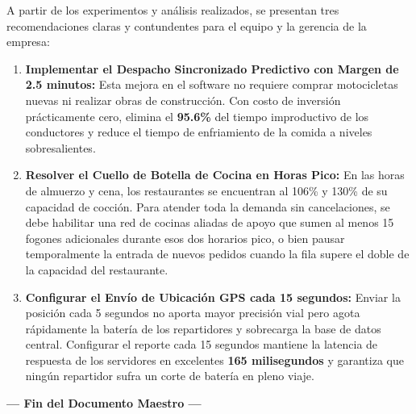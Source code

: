 \documentclass[11pt,a4paper]{article}
\begin{document}
A partir de los experimentos y análisis realizados, se presentan tres recomendaciones claras y contundentes para el equipo y la gerencia de la empresa:

\begin{enumerate}[label=\textbf{\arabic*.}]
    \item \textbf{Implementar el Despacho Sincronizado Predictivo con Margen de 2.5 minutos:} Esta mejora en el software no requiere comprar motocicletas nuevas ni realizar obras de construcción. Con costo de inversión prácticamente cero, elimina el \textbf{95.6\%} del tiempo improductivo de los conductores y reduce el tiempo de enfriamiento de la comida a niveles sobresalientes.
    \item \textbf{Resolver el Cuello de Botella de Cocina en Horas Pico:} En las horas de almuerzo y cena, los restaurantes se encuentran al 106\% y 130\% de su capacidad de cocción. Para atender toda la demanda sin cancelaciones, se debe habilitar una red de cocinas aliadas de apoyo que sumen al menos 15 fogones adicionales durante esos dos horarios pico, o bien pausar temporalmente la entrada de nuevos pedidos cuando la fila supere el doble de la capacidad del restaurante.
    \item \textbf{Configurar el Envío de Ubicación GPS cada 15 segundos:} Enviar la posición cada 5 segundos no aporta mayor precisión vial pero agota rápidamente la batería de los repartidores y sobrecarga la base de datos central. Configurar el reporte cada 15 segundos mantiene la latencia de respuesta de los servidores en excelentes \textbf{165 milisegundos} y garantiza que ningún repartidor sufra un corte de batería en pleno viaje.
\end{enumerate}

\vspace{1cm}
\begin{center}
    \textbf{--- Fin del Documento Maestro ---}
\end{center}
\end{document}
